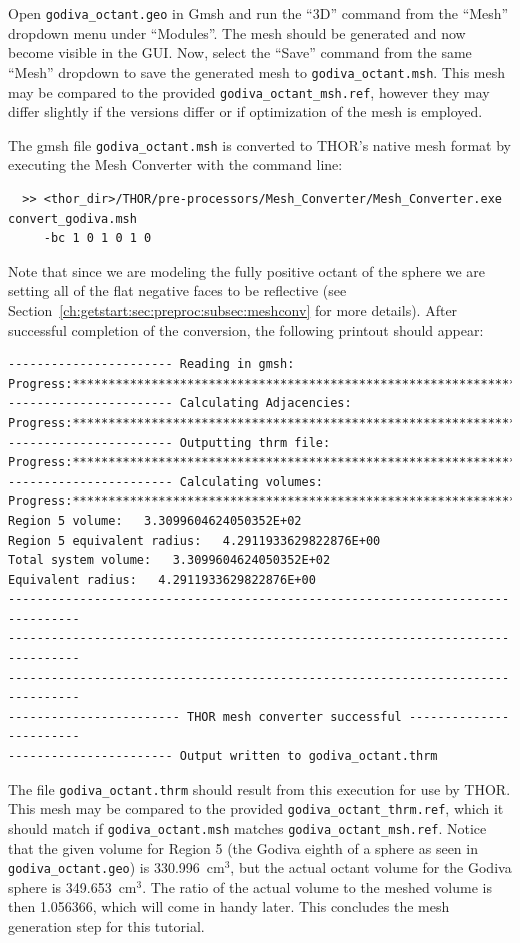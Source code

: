 Open \verb"godiva_octant.geo" in Gmsh and run the ``3D'' command from the ``Mesh'' dropdown menu under ``Modules''.
The mesh should be generated and now become visible in the \ac{GUI}.
Now, select the ``Save'' command from the same ``Mesh'' dropdown to save the generated mesh to \verb"godiva_octant.msh".
This mesh may be compared to the provided \verb"godiva_octant_msh.ref", however they may differ slightly if the versions differ or if optimization of the mesh is employed.

The gmsh file \verb"godiva_octant.msh" is converted to \ac{THOR}'s native mesh format by executing the Mesh Converter with the command line:
\begin{verbatim}
  >> <thor_dir>/THOR/pre-processors/Mesh_Converter/Mesh_Converter.exe convert_godiva.msh
     -bc 1 0 1 0 1 0
\end{verbatim}
Note that since we are modeling the fully positive octant of the sphere we are setting all of the flat negative faces to be reflective (see Section~\ref{ch:getstart:sec:preproc:subsec:meshconv} for more details).
After successful completion of the conversion, the following printout should appear:
\begin{verbatim}
----------------------- Reading in gmsh:
Progress:***********************************************************************
----------------------- Calculating Adjacencies:
Progress:***********************************************************************
----------------------- Outputting thrm file:
Progress:***********************************************************************
----------------------- Calculating volumes:
Progress:***********************************************************************
Region 5 volume:   3.3099604624050352E+02
Region 5 equivalent radius:   4.2911933629822876E+00
Total system volume:   3.3099604624050352E+02
Equivalent radius:   4.2911933629822876E+00
--------------------------------------------------------------------------------
--------------------------------------------------------------------------------
--------------------------------------------------------------------------------
------------------------ THOR mesh converter successful ------------------------
----------------------- Output written to godiva_octant.thrm
\end{verbatim}

The file \verb"godiva_octant.thrm" should result from this execution for use by THOR.
This mesh may be compared to the provided \verb"godiva_octant_thrm.ref", which it should match if \verb"godiva_octant.msh" matches \verb"godiva_octant_msh.ref".
Notice that the given volume for Region 5 (the Godiva eighth of a sphere as seen in \verb"godiva_octant.geo") is 330.996~cm$^3$, but the actual octant volume for the Godiva sphere is 349.653~cm$^3$.
The ratio of the actual volume to the meshed volume is then 1.056366, which will come in handy later.
This concludes the mesh generation step for this tutorial.

